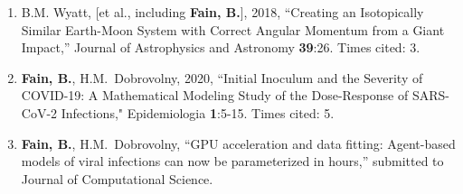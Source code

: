 \begin{enumerate} 
\item B.M. Wyatt, [et al., including \textbf{Fain, B.}], 2018, ``Creating an Isotopically Similar Earth-Moon System with Correct Angular Momentum from a Giant Impact,'' Journal of Astrophysics and Astronomy \textbf{39}:26. Times cited: 3.

\item \textbf{Fain, B.}, H.M.\ Dobrovolny, 2020, ``Initial Inoculum and the Severity of COVID-19: A Mathematical Modeling Study of the Dose-Response of SARS-CoV-2 Infections," Epidemiologia \textbf{1}:5-15. Times cited: 5.

\item \textbf{Fain, B.}, H.M.\ Dobrovolny, ``GPU acceleration and data fitting: Agent-based models of viral infections can now be parameterized in hours,'' submitted to Journal of Computational Science.
\end{enumerate}

